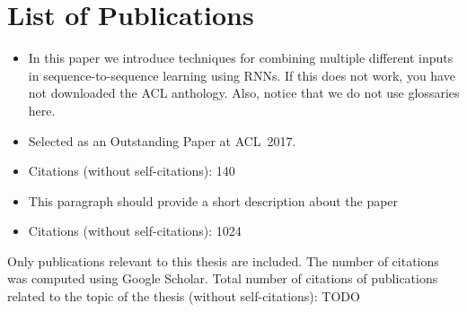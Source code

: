 \chapter*{List of Publications}


\noindent{}
\begin{itemize}[noitemsep,topsep=0pt]

\item In this paper we introduce techniques for combining multiple different
  inputs in sequence-to-sequence learning using RNNs. If this does not work,
  you have not downloaded the ACL anthology. Also, notice that we do not use
  glossaries here.
\item Selected as an Outstanding Paper at ACL~2017.

\item Citations (without self-citations): 140
\end{itemize}\vspace{.5\baselineskip}

\noindent{}
\begin{itemize}[noitemsep,topsep=0pt]

\item This paragraph should provide a short description about the paper
\item Citations (without self-citations): 1024

\end{itemize}\vspace{.5\baselineskip}

\vfill

\noindent Only publications relevant to this thesis are included. The number of
citations was computed using Google Scholar. Total number of citations of
publications related to the topic of the thesis (without self-citations):
{\large TODO} %



